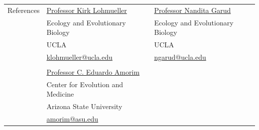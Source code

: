 \documentclass[letterpaper,11pt,oneside]{article}
\begin{document}


\noindent \begin{tabular}{@{} l l l}
\Large{References} & \href{lohmueller.eeb.ucla.edu}{Professor Kirk Lohmueller} & 
\href{https://garud.eeb.ucla.edu/}{Professor Nandita Garud} \\
& Ecology and Evolutionary Biology &  Ecology and Evolutionary Biology  \\
& UCLA &  UCLA \\
& \small{\href{mailto:klohmueller@ucla.edu}{klohmueller@ucla.edu}} &  \small{\href{mailto:ngarud@ucla.edu}{ngarud@ucla.edu}} \\
&& \\
& \href{https://search.asu.edu/profile/5486376}{Professor C. Eduardo Amorim} \\
& Center for Evolution and Medicine \\
& Arizona State University \\
& \small{\href{amorim@asu.edu}{amorim@asu.edu}} \\
\end{tabular}
\end{document}
